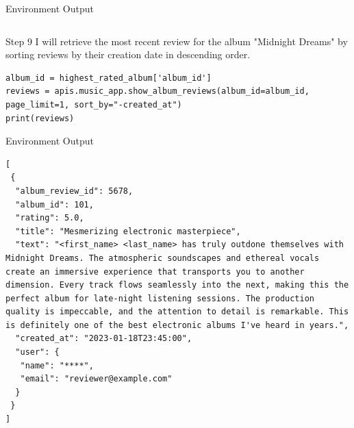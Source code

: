 \begin{center}
\begin{envbox}{Environment Output}
\begin{Verbatim}[fontsize=\scriptsize, breaklines, breakanywhere]
\end{Verbatim}
\end{envbox}

\begin{agentbox}{Step 9}
I will retrieve the most recent review for the album "Midnight Dreams" by sorting reviews by their creation date in descending order.
\begin{Verbatim}[fontsize=\scriptsize, breaklines, breakanywhere]
album_id = highest_rated_album['album_id']
reviews = apis.music_app.show_album_reviews(album_id=album_id, page_limit=1, sort_by="-created_at")
print(reviews)
\end{Verbatim}
\end{agentbox}
\begin{envbox}{Environment Output}
\begin{Verbatim}[fontsize=\scriptsize, breaklines, breakanywhere]
[
 {
  "album_review_id": 5678,
  "album_id": 101,
  "rating": 5.0,
  "title": "Mesmerizing electronic masterpiece",
  "text": "<first_name> <last_name> has truly outdone themselves with Midnight Dreams. The atmospheric soundscapes and ethereal vocals create an immersive experience that transports you to another dimension. Every track flows seamlessly into the next, making this the perfect album for late-night listening sessions. The production quality is impeccable, and the attention to detail is remarkable. This is definitely one of the best electronic albums I've heard in years.",
  "created_at": "2023-01-18T23:45:00",
  "user": {
   "name": "****",
   "email": "reviewer@example.com"
  }
 }
]

\end{Verbatim}
\end{envbox}


\end{center}

